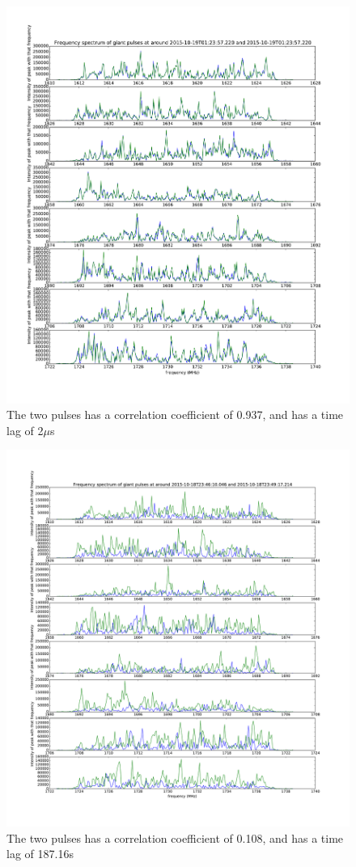 \documentclass[apj]{emulateapj}
\begin{document}
\begin{figure}[H]
\includegraphics[width=0.9\columnwidth]{co_freq_spec_2mus.pdf}
\caption{The two pulses has a correlation coefficient of 0.937, and has a time lag of 2$\mu$s}
\label{fig:freq_spec2}
\end{figure}

\begin{figure}[H]
\includegraphics[width=0.9\columnwidth]{co_freq_spec_2mus1.pdf}
\caption{The two pulses has a correlation coefficient of 0.108, and has a time lag of 187.16s}
\label{fig:freq_spec2_1}
\end{figure}
\end{document}
